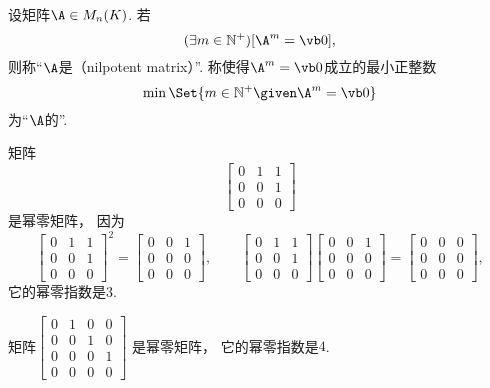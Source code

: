 \begin{definition}
设矩阵\(\A \in M_n(K)\).
若\[
	(\exists m\in\mathbb{N}^+)
	[\A^m = \vb0],
\]
则称“\(\A\)是（nilpotent matrix）”.
称使得\(\A^m = \vb0\)成立的最小正整数\[
    \min\Set{ m\in\mathbb{N}^+ \given \A^m = \vb0 }
\]为“\(\A\)的”.
\end{definition}

\begin{example}
矩阵\[
	\begin{bmatrix}
		0 & 1 & 1 \\
		0 & 0 & 1 \\
		0 & 0 & 0
	\end{bmatrix}
\]是幂零矩阵，
因为\[
	\begin{bmatrix}
		0 & 1 & 1 \\
		0 & 0 & 1 \\
		0 & 0 & 0
	\end{bmatrix}^2
	=
	\begin{bmatrix}
		0 & 0 & 1 \\
		0 & 0 & 0 \\
		0 & 0 & 0
	\end{bmatrix},
	\qquad
	\begin{bmatrix}
		0 & 1 & 1 \\
		0 & 0 & 1 \\
		0 & 0 & 0
	\end{bmatrix}
	\begin{bmatrix}
		0 & 0 & 1 \\
		0 & 0 & 0 \\
		0 & 0 & 0
	\end{bmatrix}
	=
	\begin{bmatrix}
		0 & 0 & 0 \\
		0 & 0 & 0 \\
		0 & 0 & 0
	\end{bmatrix},
\]
它的幂零指数是\(3\).
\end{example}
\begin{example}
矩阵\begin{math}
	\begin{bmatrix}
		0 & 1 & 0 & 0 \\
		0 & 0 & 1 & 0 \\
		0 & 0 & 0 & 1 \\
		0 & 0 & 0 & 0
	\end{bmatrix}
\end{math}
是幂零矩阵，
它的幂零指数是\(4\).
\end{example}

